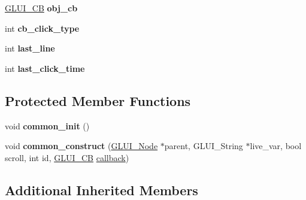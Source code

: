 \begin{DoxyCompactItemize}
\item 
\hypertarget{classGLUI__List_ada809121f5b61c3ec100ef2b2cc87a3e}{\hyperlink{classGLUI__CB}{G\-L\-U\-I\-\_\-\-C\-B} {\bfseries obj\-\_\-cb}}\label{classGLUI__List_ada809121f5b61c3ec100ef2b2cc87a3e}

\item 
\hypertarget{classGLUI__List_a10035be2d469c11e4009e77540bdf080}{int {\bfseries cb\-\_\-click\-\_\-type}}\label{classGLUI__List_a10035be2d469c11e4009e77540bdf080}

\item 
\hypertarget{classGLUI__List_a500f3a7a615367a44088d69c8e537ba6}{int {\bfseries last\-\_\-line}}\label{classGLUI__List_a500f3a7a615367a44088d69c8e537ba6}

\item 
\hypertarget{classGLUI__List_af90d2646dbb12f1dbe1bfd9e8891fc37}{int {\bfseries last\-\_\-click\-\_\-time}}\label{classGLUI__List_af90d2646dbb12f1dbe1bfd9e8891fc37}

\end{DoxyCompactItemize}
\subsection*{Protected Member Functions}
\begin{DoxyCompactItemize}
\item 
\hypertarget{classGLUI__List_a2693fbb3bd3dd6bb051ca1f02d4a017c}{void {\bfseries common\-\_\-init} ()}\label{classGLUI__List_a2693fbb3bd3dd6bb051ca1f02d4a017c}

\item 
\hypertarget{classGLUI__List_abe3d92ffe3c2795adb4b0b2bec3a390a}{void {\bfseries common\-\_\-construct} (\hyperlink{classGLUI__Node}{G\-L\-U\-I\-\_\-\-Node} $\ast$parent, G\-L\-U\-I\-\_\-\-String $\ast$live\-\_\-var, bool scroll, int id, \hyperlink{classGLUI__CB}{G\-L\-U\-I\-\_\-\-C\-B} \hyperlink{classGLUI__Control_a96060fe0cc6d537e736dd6eef78e24ab}{callback})}\label{classGLUI__List_abe3d92ffe3c2795adb4b0b2bec3a390a}

\end{DoxyCompactItemize}
\subsection*{Additional Inherited Members}



